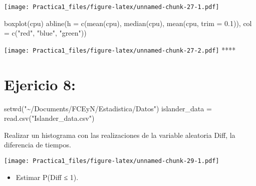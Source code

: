 \documentclass[
]{article}
\newenvironment{Shaded}{\begin{snugshade}}{\end{snugshade}}
\newcommand{\AttributeTok}[1]{\textcolor[rgb]{0.77,0.63,0.00}{#1}}
\newcommand{\FloatTok}[1]{\textcolor[rgb]{0.00,0.00,0.81}{#1}}
\newcommand{\FunctionTok}[1]{\textcolor[rgb]{0.00,0.00,0.00}{#1}}
\newcommand{\NormalTok}[1]{#1}
\newcommand{\OtherTok}[1]{\textcolor[rgb]{0.56,0.35,0.01}{#1}}
\newcommand{\SpecialCharTok}[1]{\textcolor[rgb]{0.00,0.00,0.00}{#1}}
\newcommand{\StringTok}[1]{\textcolor[rgb]{0.31,0.60,0.02}{#1}}
\providecommand{\tightlist}{%
  \setlength{\itemsep}{0pt}\setlength{\parskip}{0pt}}
\begin{document}
\texttt{[image: Practica1\_files/figure-latex/unnamed-chunk-27-1.pdf]}

\begin{Shaded}
\begin{Highlighting}[]
\FunctionTok{boxplot}\NormalTok{(cpu)}
\FunctionTok{abline}\NormalTok{(}\AttributeTok{h =} \FunctionTok{c}\NormalTok{(}\FunctionTok{mean}\NormalTok{(cpu), }\FunctionTok{median}\NormalTok{(cpu), }\FunctionTok{mean}\NormalTok{(cpu, }\AttributeTok{trim =} \FloatTok{0.1}\NormalTok{)), }\AttributeTok{col =} \FunctionTok{c}\NormalTok{(}\StringTok{"red"}\NormalTok{, }\StringTok{"blue"}\NormalTok{, }\StringTok{"green"}\NormalTok{))}
\end{Highlighting}
\end{Shaded}

\texttt{[image: Practica1\_files/figure-latex/unnamed-chunk-27-2.pdf]}
****

\hypertarget{ejericio-8}{%
\section{Ejericio 8:}\label{ejericio-8}}

\begin{Shaded}
\begin{Highlighting}[]
\FunctionTok{setwd}\NormalTok{(}\StringTok{"\textasciitilde{}/Documents/FCEyN/Estadistica/Datos"}\NormalTok{)}
\NormalTok{islander\_data }\OtherTok{=} \FunctionTok{read.csv}\NormalTok{(}\StringTok{"Islander\_data.csv"}\NormalTok{)}
\end{Highlighting}
\end{Shaded}

Realizar un histograma con las realizaciones de la variable aleatoria
Diff, la diferencia de tiempos.

\begin{Shaded}
\end{Shaded}

\texttt{[image: Practica1\_files/figure-latex/unnamed-chunk-29-1.pdf]}

\begin{itemize}
\tightlist
\item
  Estimar P(Diff ≤ 1).
\end{itemize}
\end{document}
